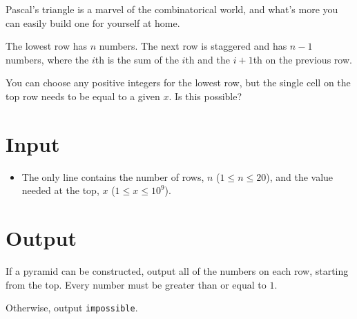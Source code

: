 
Pascal's triangle is a marvel of the combinatorical world, and what's more you
can easily build one for yourself at home.

The lowest row has $n$ numbers. The next row is staggered and has $n-1$ numbers,
where the $i$th is the sum of the $i$th and the $i+1$th on the previous row.

You can choose any positive integers for the lowest row, but the single cell on
the top row needs to be equal to a given $x$. Is this possible?

\section*{Input}

\begin{itemize}
  \item The only line contains the number of rows, $n$ ($1 \le n \le 20$),
        and the value needed at the top, $x$ ($1 \le x \le 10^9$).
\end{itemize}

\section*{Output}

If a pyramid can be constructed, output all of the numbers on each row, starting
from the top. Every number must be greater than or equal to $1$.

Otherwise, output \texttt{impossible}.

